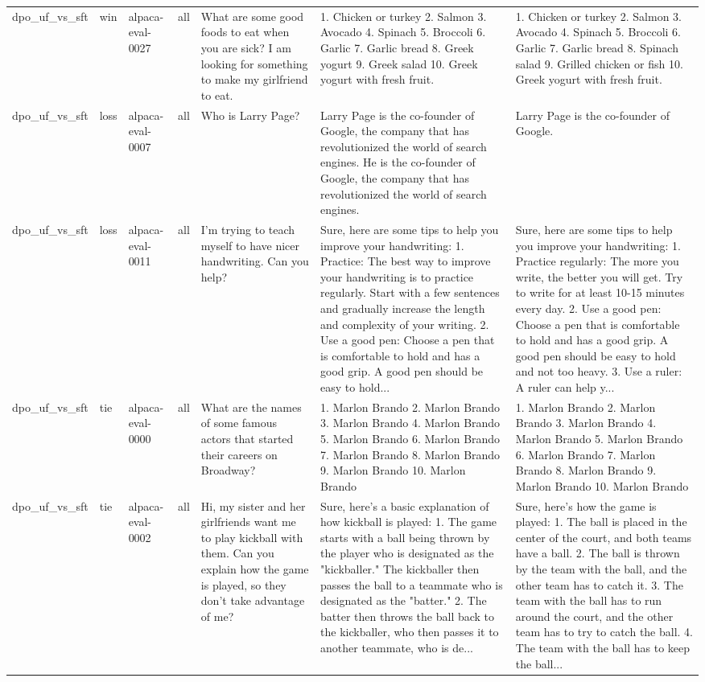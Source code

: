 \begin{tabular}{lllllll}
dpo\_uf\_vs\_sft & win & alpaca-eval-0027 & all & What are some good foods to eat when you are sick? I am looking for something to make my girlfriend to eat. & 1. Chicken or turkey 2. Salmon 3. Avocado 4. Spinach 5. Broccoli 6. Garlic 7. Garlic bread 8. Greek yogurt 9. Greek salad 10. Greek yogurt with fresh fruit. & 1. Chicken or turkey 2. Salmon 3. Avocado 4. Spinach 5. Broccoli 6. Garlic 7. Garlic bread 8. Spinach salad 9. Grilled chicken or fish 10. Greek yogurt with fresh fruit. \\
dpo\_uf\_vs\_sft & loss & alpaca-eval-0007 & all & Who is Larry Page? & Larry Page is the co-founder of Google, the company that has revolutionized the world of search engines. He is the co-founder of Google, the company that has revolutionized the world of search engines. & Larry Page is the co-founder of Google. \\
dpo\_uf\_vs\_sft & loss & alpaca-eval-0011 & all & I'm trying to teach myself to have nicer handwriting. Can you help? & Sure, here are some tips to help you improve your handwriting: 1. Practice: The best way to improve your handwriting is to practice regularly. Start with a few sentences and gradually increase the length and complexity of your writing. 2. Use a good pen: Choose a pen that is comfortable to hold and has a good grip. A good pen should be easy to hold... & Sure, here are some tips to help you improve your handwriting: 1. Practice regularly: The more you write, the better you will get. Try to write for at least 10-15 minutes every day. 2. Use a good pen: Choose a pen that is comfortable to hold and has a good grip. A good pen should be easy to hold and not too heavy. 3. Use a ruler: A ruler can help y... \\
dpo\_uf\_vs\_sft & tie & alpaca-eval-0000 & all & What are the names of some famous actors that started their careers on Broadway? & 1. Marlon Brando 2. Marlon Brando 3. Marlon Brando 4. Marlon Brando 5. Marlon Brando 6. Marlon Brando 7. Marlon Brando 8. Marlon Brando 9. Marlon Brando 10. Marlon Brando & 1. Marlon Brando 2. Marlon Brando 3. Marlon Brando 4. Marlon Brando 5. Marlon Brando 6. Marlon Brando 7. Marlon Brando 8. Marlon Brando 9. Marlon Brando 10. Marlon Brando \\
dpo\_uf\_vs\_sft & tie & alpaca-eval-0002 & all & Hi, my sister and her girlfriends want me to play kickball with them. Can you explain how the game is played, so they don't take advantage of me? & Sure, here's a basic explanation of how kickball is played: 1. The game starts with a ball being thrown by the player who is designated as the "kickballer." The kickballer then passes the ball to a teammate who is designated as the "batter." 2. The batter then throws the ball back to the kickballer, who then passes it to another teammate, who is de... & Sure, here's how the game is played: 1. The ball is placed in the center of the court, and both teams have a ball. 2. The ball is thrown by the team with the ball, and the other team has to catch it. 3. The team with the ball has to run around the court, and the other team has to try to catch the ball. 4. The team with the ball has to keep the ball... \\

\end{tabular}
